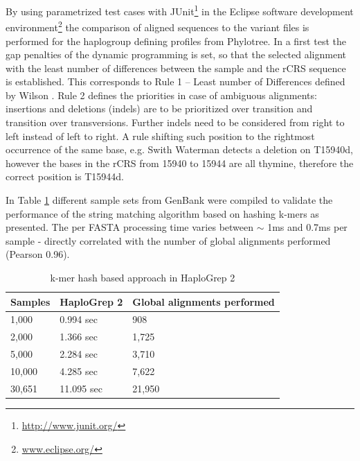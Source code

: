 By using parametrized test cases with JUnit\footnote{\url{http://www.junit.org/}} in the Eclipse software development environment\footnote{\url{www.eclipse.org/}} the comparison of aligned sequences to the variant files is performed for the haplogroup defining profiles from Phylotree. In a first test the gap penalties of the dynamic programming is set, so that the selected alignment with the least number of differences between the sample and the rCRS sequence is established. This corresponds to Rule 1 – Least number of Differences defined by Wilson \cite{Wilson2002}. Rule 2 defines the priorities in case of ambiguous alignments: insertions and deletions (indels) are to be prioritized over transition and transition over transversions. Further indels need to be considered from right to left instead of left to right. A rule shifting such position to the rightmost occurrence of the same base, e.g. Swith Waterman detects a deletion on T15940d, however the bases in the rCRS from 15940 to 15944 are all thymine, therefore the correct position is T15944d. 

In Table \ref{time:HG2} different sample sets from GenBank were compiled to validate the performance of the string matching algorithm based on hashing k-mers as presented. The per FASTA processing time varies between $\sim$ 1ms and 0.7ms per sample - directly correlated with the number of global alignments performed (Pearson 0.96).
\begin{table}[H]
\centering
\caption{k-mer hash based approach in HaploGrep 2}
\label{time:HG2}
\begin{tabular}{|l|l|l|}
\hline
Samples &  HaploGrep 2 &  Global alignments performed   \\ \hline
1,000    & 0.994 sec  &   908        \\ \hline
2,000    & 1.366 sec &   1,725        \\ \hline
5,000    & 2.284 sec &   3,710        \\ \hline
10,000   & 4.285 sec &   7,622        \\ \hline 
30,651   & 11.095 sec&  21,950    \\ \hline
\end{tabular}
\end{table}
